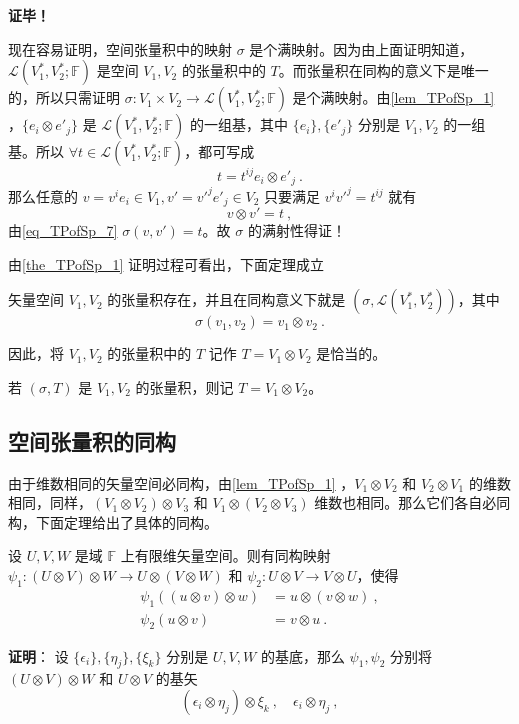 \textbf{证毕！}

现在容易证明，空间张量积中的映射 $\sigma$ 是个满映射。因为由上面证明知道，$\mathcal L(V_1^*,V_2^*;\mathbb F)$ 是空间 $V_1,V_2$ 的张量积中的 $T$。而张量积在同构的意义下是唯一的，所以只需证明 $\sigma:V_1\times V_2\rightarrow \mathcal L(V_1^*,V_2^*;\mathbb F)$ 是个满映射。由\autoref{lem_TPofSp_1} ，$\{e_i\otimes e'_j\}$ 是 $\mathcal L(V_1^*,V_2^*;\mathbb F)$ 的一组基，其中 $\{e_i\},\{e'_j\}$ 分别是 $V_1,V_2$ 的一组基。所以 $\forall t\in \mathcal L(V_1^*,V_2^*;\mathbb F)$，都可写成
\begin{equation}
t=t^{ij}e_i\otimes e'_j~.
\end{equation}
那么任意的 $v=v^i e_i\in V_1,v'=v'^j e'_j\in V_2$ 只要满足 $v^iv'^j=t^{ij}$ 就有
\begin{equation}
v\otimes v'=t~,
\end{equation}
由\autoref{eq_TPofSp_7} $\sigma(v,v')=t$。故 $\sigma$ 的满射性得证！

由\autoref{the_TPofSp_1} 证明过程可看出，下面定理成立
\begin{theorem}{}
矢量空间 $V_1,V_2$ 的张量积存在，并且在同构意义下就是 $(\sigma,\mathcal L(V_1^*,V_2^*))$，其中
\begin{equation}
\sigma(v_1,v_2)=v_1\otimes v_2~.
\end{equation}
\end{theorem}
 
 因此，将 $V_1,V_2$ 的张量积中的 $T$ 记作 $T=V_1\otimes V_2$ 是恰当的。

\begin{definition}{}
若 $(\sigma ,T)$ 是 $V_1,V_2$ 的张量积，则记 $T=V_1\otimes V_2$。
\end{definition}
\subsection{空间张量积的同构}
由于维数相同的矢量空间必同构，由\autoref{lem_TPofSp_1} ，$V_1\otimes V_2$ 和 $V_2\otimes V_1$ 的维数相同，同样，$(V_1\otimes V_2)\otimes V_3$ 和 $V_1\otimes( V_2\otimes V_3)$ 维数也相同。那么它们各自必同构，下面定理给出了具体的同构。
\begin{theorem}{}\label{the_TPofSp_2}
设 $U,V,W$ 是域 $\mathbb F$ 上有限维矢量空间。则有同构映射 $\psi_1:(U\otimes V)\otimes W\rightarrow U\otimes(V\otimes W)$ 和 $\psi_2:U\otimes V\rightarrow V\otimes U$，使得
\begin{equation}
\begin{aligned}
\psi_1((u\otimes v)\otimes w)&=u\otimes(v\otimes w)~,\\
\psi_2(u\otimes v)&=v\otimes u~.
\end{aligned}
\end{equation}
\end{theorem}
\textbf{证明}： 设 $\{\epsilon_i\},\{\eta_j\},\{\xi_k\}$ 分别是 $U,V,W$ 的基底，那么 $\psi_1,\psi_2$ 分别将 $(U\otimes V)\otimes W$ 和 $U\otimes V$ 的基矢
\begin{equation}
(\epsilon_i\otimes\eta_j)\otimes\xi_k~,\quad \epsilon_i\otimes\eta_j~,
\end{equation}


